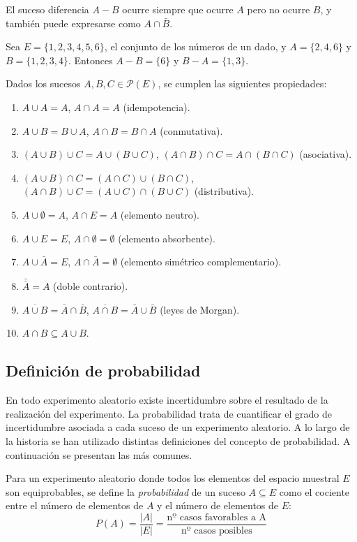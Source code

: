 El suceso diferencia $A-B$ ocurre siempre que ocurre $A$ pero no ocurre $B$, y también puede expresarse como $A\cap \bar B$.

\begin{ejemplo}
Sea $E=\{1,2,3,4,5,6\}$, el conjunto de los números de un dado, y $A=\{2,4,6\}$ y $B=\{1,2,3,4\}$. 
Entonces $A-B=\{6\}$ y $B-A=\{1,3\}$.
\end{ejemplo}

Dados los sucesos $A,B,C\in  \mathcal{P}(E)$, se cumplen las siguientes propiedades:
\begin{enumerate}
\item $A\cup A=A$, $A\cap A=A$ (idempotencia).
\item $A\cup B=B\cup A$, $A\cap B = B\cap A$ (conmutativa).
\item $(A\cup B)\cup C = A\cup (B\cup C)$, $(A\cap B)\cap C = A\cap (B\cap C)$ (asociativa).
\item $(A\cup B)\cap C = (A\cap C)\cup (B\cap C)$, $(A\cap B)\cup C = (A\cup C)\cap (B\cup C)$ (distributiva).
\item $A\cup \emptyset=A$, $A\cap E=A$ (elemento neutro).
\item $A\cup E=E$, $A\cap \emptyset=\emptyset$ (elemento absorbente).
\item $A\cup \bar A = E$, $A\cap \bar A= \emptyset$ (elemento simétrico complementario).
\item $\bar{\bar A} = A$ (doble contrario).
\item $\overline{A\cup B} = \bar A\cap \bar B$, $\overline{A\cap B} = \bar A\cup \bar B$ (leyes de Morgan).
\item $A\cap B\subseteq A\cup B$.
\end{enumerate}

\subsection{Definición de probabilidad}
En todo experimento aleatorio existe incertidumbre sobre el resultado de la realización del experimento. 
La probabilidad trata de cuantificar el grado de incertidumbre asociada a cada suceso de un experimento aleatorio. 
A lo largo de la historia se han utilizado distintas definiciones del concepto de probabilidad. 
A continuación se presentan las más comunes. 

\begin{definicion}
Para un experimento aleatorio donde todos los elementos del espacio muestral $E$ son equiprobables, se define la \emph{probabilidad} de un
suceso $A\subseteq E $ como el cociente entre el número de elementos de $A$ y el número de elementos de $E$:
\[ P(A) = \frac{|A|}{|E|} = \frac{\mbox{nº casos favorables a A}}{\mbox{nº casos posibles}}\]
\end{definicion}

